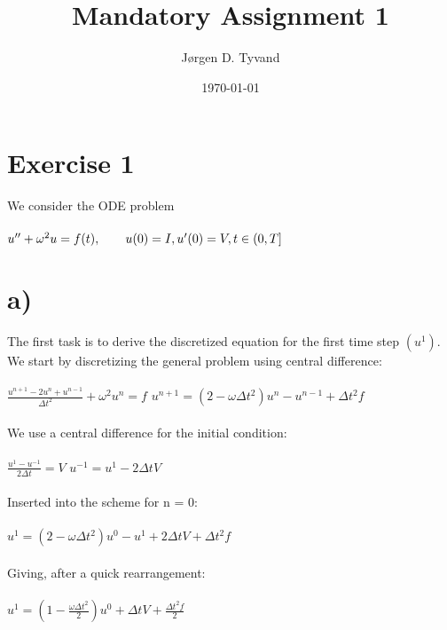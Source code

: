 \documentclass[a4paper,english,11pt,twoside]{article}
\date{\today}
\title{Mandatory Assignment 1}
\author{Jørgen D. Tyvand}
\newcommand{\tab}{\hspace*{2em}}
\begin{document}
\maketitle
\newpage

\section*{Exercise 1}
We consider the ODE problem\\
\\
$u'' + \omega^2u = f(t),\tab u(0) = I, u'(0) = V, t \in (0,T]$\\
\section*{a)}
The first task is to derive the discretized equation for the first time step $(u^1).$\\
We start by discretizing the general problem using central difference:\\
\\
$\frac{u^{n+1} - 2u^n + u^{n-1}}{\Delta t^2} + \omega^2u^n = f$
$u^{n+1} = (2 - \omega\Delta t^2)u^n - u^{n-1} + \Delta t^2f$\\
\\
We use a central difference for the initial condition:\\
\\
$\frac{u^1 - u^{-1}}{2\Delta t} = V$
$u^{-1} = u^1 - 2\Delta t V$\\
\\
Inserted into the scheme for n = 0:\\
\\
$u^1 = (2 - \omega\Delta t^2)u^0 - u^1 + 2\Delta t V + \Delta t^2f$\\
\\
Giving, after a quick rearrangement:\\
\\
$u^1 = (1 - \frac{\omega\Delta t^2}{2})u^0  + \Delta t V +\frac{ \Delta t^2f}{2}$\\
\newpage
\end{document}
